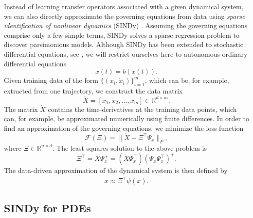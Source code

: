 \documentclass
[
    a4paper,
    DIV=11,
    abstract=true,
    11pt,
]
{scrartcl}
\newcommand{\R}{\mathbb{R}}                                      %
\theoremstyle{definition}
\begin{document}
Instead of learning transfer operators associated with a given dynamical system, we can also directly approximate the governing equations from data using \emph{sparse identification of nonlinear dynamics} (SINDy) \cite{brunton2016discovering}. Assuming the governing equations comprise only a few simple terms, SINDy solves a sparse regression problem to discover parsimonious models. Although SINDy has been extended to stochastic differential equations, see \cite{BNC18, KNPNCS20}, we will restrict ourselves here to autonomous ordinary differential equations
\begin{equation*}
    \dot{x}(t) = b(x(t)).
\end{equation*}
Given training data of the form $ \{ (x_i, \dot{x}_i) \}_{i=1}^m $, which can be, for example, extracted from one trajectory, we construct the data matrix
\begin{equation*}
\dot{X} = [\dot{x}_1, \dot{x}_2, \dots, \dot{x}_m] \in \R^{d \times m}.
\end{equation*}
The matrix $\dot{X}$ contains the time-derivatives at the training data points, which can, for example, be approximated numerically using finite differences. In order to find an approximation of the governing equations, we minimize the loss function
\begin{equation*}
    \mathcal{F}(\Xi) = \big \| \dot{X} - \Xi^{\top}\Psi_x \big \|_F,
\end{equation*}
where $ \Xi \in \R^{n \times d} $. The least squares solution to the above problem is
\begin{equation*}
    \Xi^\top = \dot{X}\Psi_x^+ = (\dot{X}\Psi_x^\top)(\Psi_x\Psi_x^\top)^+.
\end{equation*}
The data-driven approximation of the dynamical system is then defined by
\begin{align*}
    \dot{x} \approx \Xi^{\top}\psi(x).
\end{align*}

\subsection{SINDy for PDEs}
\end{document}

